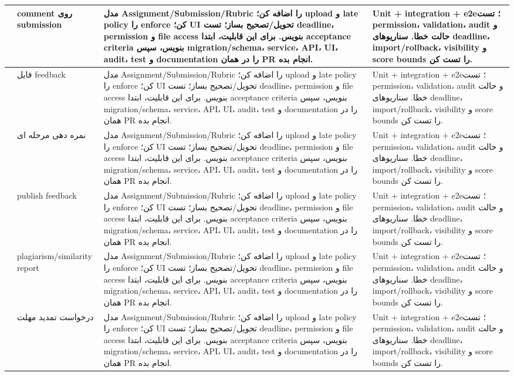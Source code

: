 \documentclass[11pt,a4paper]{article}
\begin{document}
\begin{longtable}{|>{\raggedleft\arraybackslash}p{}|>{\raggedleft\arraybackslash}p{}|>{\raggedleft\arraybackslash}p{}|>{\raggedleft\arraybackslash}p{}|}
111 & comment روی submission & مدل Assignment/Submission/Rubric را اضافه کن؛ upload و late policy را enforce کن؛ UI تحویل/تصحیح بساز؛ تست deadline، permission و file access بنویس. برای این قابلیت، ابتدا acceptance criteria بنویس، سپس migration/schema، service، API، UI، audit، test و documentation را در همان PR انجام بده. & Unit + integration + e2e؛ تست permission، validation، audit و حالت خطا. سناریوهای deadline، import/rollback، visibility و score bounds را تست کن. \\ \hline
112 & فایل feedback & مدل Assignment/Submission/Rubric را اضافه کن؛ upload و late policy را enforce کن؛ UI تحویل/تصحیح بساز؛ تست deadline، permission و file access بنویس. برای این قابلیت، ابتدا acceptance criteria بنویس، سپس migration/schema، service، API، UI، audit، test و documentation را در همان PR انجام بده. & Unit + integration + e2e؛ تست permission، validation، audit و حالت خطا. سناریوهای deadline، import/rollback، visibility و score bounds را تست کن. \\ \hline
113 & نمره دهی مرحله ای & مدل Assignment/Submission/Rubric را اضافه کن؛ upload و late policy را enforce کن؛ UI تحویل/تصحیح بساز؛ تست deadline، permission و file access بنویس. برای این قابلیت، ابتدا acceptance criteria بنویس، سپس migration/schema، service، API، UI، audit، test و documentation را در همان PR انجام بده. & Unit + integration + e2e؛ تست permission، validation، audit و حالت خطا. سناریوهای deadline، import/rollback، visibility و score bounds را تست کن. \\ \hline
114 & publish feedback & مدل Assignment/Submission/Rubric را اضافه کن؛ upload و late policy را enforce کن؛ UI تحویل/تصحیح بساز؛ تست deadline، permission و file access بنویس. برای این قابلیت، ابتدا acceptance criteria بنویس، سپس migration/schema، service، API، UI، audit، test و documentation را در همان PR انجام بده. & Unit + integration + e2e؛ تست permission، validation، audit و حالت خطا. سناریوهای deadline، import/rollback، visibility و score bounds را تست کن. \\ \hline
115 & plagiarism/similarity report & مدل Assignment/Submission/Rubric را اضافه کن؛ upload و late policy را enforce کن؛ UI تحویل/تصحیح بساز؛ تست deadline، permission و file access بنویس. برای این قابلیت، ابتدا acceptance criteria بنویس، سپس migration/schema، service، API، UI، audit، test و documentation را در همان PR انجام بده. & Unit + integration + e2e؛ تست permission، validation، audit و حالت خطا. سناریوهای deadline، import/rollback، visibility و score bounds را تست کن. \\ \hline
116 & درخواست تمدید مهلت & مدل Assignment/Submission/Rubric را اضافه کن؛ upload و late policy را enforce کن؛ UI تحویل/تصحیح بساز؛ تست deadline، permission و file access بنویس. برای این قابلیت، ابتدا acceptance criteria بنویس، سپس migration/schema، service، API، UI، audit، test و documentation را در همان PR انجام بده. & Unit + integration + e2e؛ تست permission، validation، audit و حالت خطا. سناریوهای deadline، import/rollback، visibility و score bounds را تست کن. \\ \hline

\end{longtable}
\end{document}
